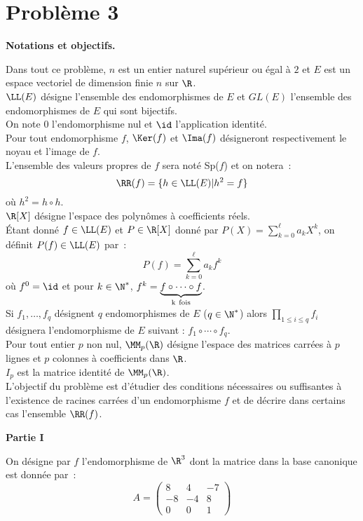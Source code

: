 \documentclass[twoside,french,11pt]{VcCours}
\renewcommand{\l}{\LL(E)}
\begin{document}
\section*{Problème 3}
\centerline{\bf Notations et objectifs.}
\bigskip
\noindent Dans tout ce problème, $n$ est un entier naturel supérieur ou égal à $2$ et $E$ est un espace vectoriel de dimension finie $n$ sur $\R$.\\
$\l$ désigne l'ensemble des endomorphismes de $E$ et $GL(E)$ l'ensemble des endomorphismes de $E$ qui sont bijectifs.\\
On note $0$ l'endomorphisme nul et $\id$ l'application identité.\\
Pour tout endomorphisme $f$, $\Ker (f)$ et $\Ima(f)$ désigneront respectivement le noyau et l'image de $f$.\\
L'ensemble des valeurs propres de $f$ sera noté Sp($f$) et on notera~:
$$
\RR(f)= \{h \in \l | h^2=f \}
$$
où $h^2=h \circ h$.\\
$\R[X]$ désigne l'espace des polynômes à coefficients réels.\\
Étant donné $f \in \l$ et $P \in \R[X]$ donné par $P(X)= \sum_{k=0}^{\ell} a_k X^k$, on définit $P(f) \in \l$ par~:
$$
P(f)=\sum_{k=0}^\ell a_k f^k
$$
o\`u $f^0=\id$ et pour $k \in \N^*$, $f^k=\underset{\rm k \ fois} {\underbrace{f \circ \cdots \circ f}}$.\\
Si $f_1,\ldots,f_q$ désignent $q$ endomorphismes de $E$ ($q \in \N^*$) alors $\prod_{1 \le i \le q} f_i$ désignera l'endomorphisme de $E$ suivant : $f_1 \circ \cdots \circ f_q$.\\
Pour tout entier $p$ non nul, $\MM_p(\R)$ désigne l'espace des matrices carrées à $p$ lignes et $p$ colonnes à coefficients dans $\R$.\\
$I_p$ est la matrice identité de $\MM_p(\R)$.\\
L'objectif du problème est d'étudier des conditions nécessaires ou suffisantes à l'existence de racines carrées d'un endomorphisme $f$ et de décrire dans certains cas l'ensemble $\RR(f)$. 



\vskip 1.8cm
\centerline{\bf Partie I}
\bigskip
{} On désigne par $f$ l'endomorphisme de $\R^3$ dont la matrice dans la base canonique est donnée par~:
$$
A=
\begin{pmatrix}
8 & 4 & -7 \\
-8 & -4 & 8 \\
0 & 0 & 1
\end{pmatrix}
$$
\end{document}
